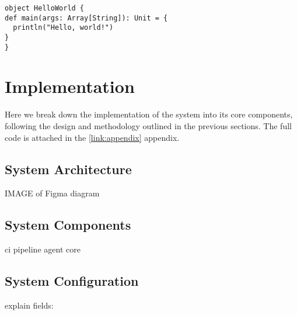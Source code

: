 

\begin{lstlisting}[caption={Ein Beispiel: Hello World (Scala)}]
object HelloWorld {
def main(args: Array[String]): Unit = {
  println("Hello, world!")
}
}
\end{lstlisting}

\section{Implementation}
Here we break down the implementation of the system into its core components, following the design and methodology outlined in the previous sections. The full code is attached in the \ref{link:appendix} appendix.


\subsection{System Architecture}

IMAGE of Figma diagram

\subsection{System Components}

ci pipeline
agent core

\subsection{System Configuration}
explain fields: